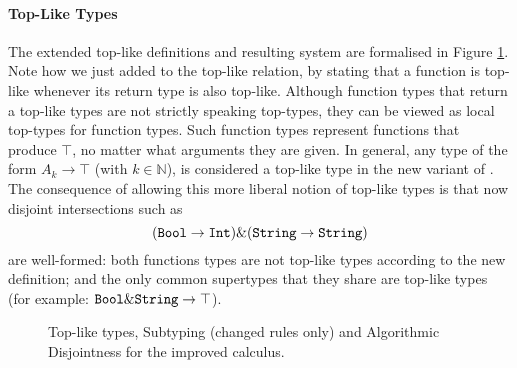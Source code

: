 \paragraph{Top-Like Types}
The extended top-like definitions and resulting system are formalised
in Figure \ref{fig:tltypesextdis}.  Note how we just added
 to the top-like relation, by stating that a
function is top-like whenever its return type is also
top-like. Although function types that return a top-like types are not
strictly speaking top-types, they can be viewed as local top-types for function
types. Such function types represent functions that produce $\top$, no
matter what arguments they are given.  In general, any type of the
form $A_k \to \top$ (with $k \in \mathbb{N}$), is considered a
top-like type in the new variant of \name. The consequence of allowing 
this more liberal notion of top-like types is that now disjoint
intersections such as \[ (\texttt{Bool} \to \texttt{Int}) \& (\texttt{String} \to \texttt{String}) \]
are well-formed: both functions types are not top-like types according
to the new definition; and the only common supertypes that they share
are top-like types (for example: $\texttt{Bool}\&\texttt{String} \to \texttt{$\top$}$).

\begin{figure}[t]




  \caption{Top-like types, Subtyping (changed rules only) and Algorithmic Disjointness for the improved calculus.}
  \label{fig:tltypesextdis}
\end{figure}

